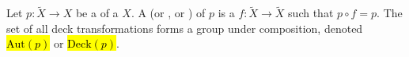 \begin{definition} \label{definition:deck_transformation_of_a_covering_space}
Let $p: \tilde{X} \to X$ be a  of a  $X$. 
A  (or , or ) of $p$ is a  $f: \tilde{X} \to \tilde{X}$ such that $p \circ f = p$. The set of all deck transformations forms a group under composition, denoted \hl{$\text{Aut}(p)$} or \hl{$\text{Deck}(p)$}.
\end{definition}